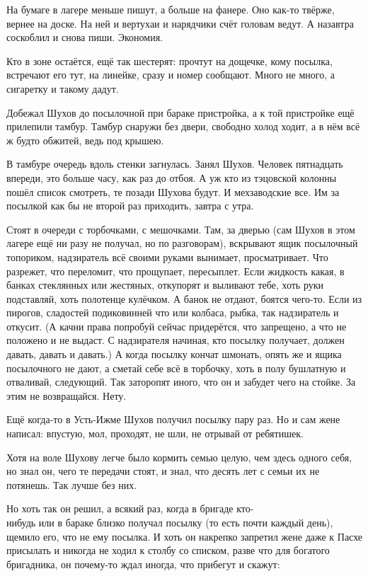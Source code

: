 На бумаге в лагере меньше пишут, а больше \dash на фанере. Оно как-то твёрже, вернее \dash на доске. На
ней и вертухаи и нарядчики счёт головам ведут. А назавтра соскоблил \dash и снова пиши. Экономия.

Кто в зоне остаётся, ещё так шестерят: прочтут на дощечке, кому посылка, встречают его тут, на
линейке, сразу и номер сообщают. Много не много, а сигаретку и такому дадут.

Добежал Шухов до посылочной \dash при бараке пристройка, а к той пристройке ещё прилепили
тамбур. Тамбур снаружи без двери, свободно холод ходит, \dash а в нём всё ж будто обжитей, ведь
под крышею.

В тамбуре очередь вдоль стенки загнулась. Занял Шухов. Человек пятнадцать впереди, это
больше часу, как раз до отбоя. А уж кто из тэцовской колонны пошёл список смотреть, те позади
Шухова будут. И мехзаводские все. Им за посылкой как бы не второй раз приходить, завтра с утра.

Стоят в очереди с торбочками, с мешочками. Там, за дверью (сам Шухов в этом лагере ещё ни разу
не получал, но по разговорам), вскрывают ящик посылочный топориком, надзиратель всё своими
руками вынимает, просматривает. Что разрежет, что переломит, что прощупает, пересыплет. Если
жидкость какая, в банках стеклянных или жестяных, откупорят и выливают тебе, хоть руки
подставляй, хоть полотенце кулёчком. А банок не отдают, боятся чего-то. Если из пирогов,
сладостей подиковинней что или колбаса, рыбка, так надзиратель и откусит. (А качни права
попробуй \dash сейчас придерётся, что запрещено, а что не положено \dash и не выдаст. С надзирателя
начиная, кто посылку получает, должен давать, давать и давать.) А когда посылку кончат
шмонать, опять же и ящика посылочного не дают, а сметай себе всё в торбочку, хоть в полу
бушлатную \dash и отваливай, следующий. Так заторопят иного, что он и забудет чего на стойке. За
этим не возвращайся. Нету.

Ещё когда-то в Усть-Ижме Шухов получил посылку пару раз. Но и сам жене написал: впустую, мол,
проходят, не шли, не отрывай от ребятишек.

Хотя на воле Шухову легче было кормить семью целую, чем здесь одного себя, но знал он, чего те
передачи стоят, и знал, что десять лет с семьи их не потянешь. Так лучше без них.

Но хоть так он решил, а всякий раз, когда в бригаде кто-\\нибудь или в бараке близко получал
посылку (то есть почти каждый день), щемило его, что не ему посылка. И хоть он накрепко
запретил жене даже к Пасхе присылать и никогда не ходил к столбу со списком, разве что для
богатого бригадника, \dash он почему-то ждал иногда, что прибегут и скажут:

